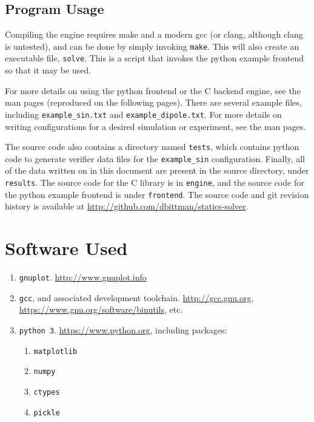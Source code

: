\documentclass[12pt]{article}
\begin{document}
\clearpage
\begin{appendices}
\section{Program Usage}

Compiling the engine requires make and a modern gcc (or clang, although clang is untested), and can
be done by simply invoking \texttt{make}. This will also create an executable file, \texttt{solve}. This
is a script that invokes the python example frontend so that it may be used.

For more details on using the python frontend or the C backend engine, see the man pages (reproduced on the
following pages). There are several example files, including \texttt{example\_sin.txt} and \texttt{example\_dipole.txt}.
For more details on writing configurations for a desired simulation or experiment, see the man pages.

The source code also contains a directory named \texttt{tests}, which contains python code to generate verifier data
files for the \texttt{example\_sin} configuration. Finally, all of the data written on in this document are present
in the source directory, under \texttt{results}. The source code for the C library is in \texttt{engine}, and the
source code for the python example frontend is under \texttt{frontend}. The source code and git revision history
is available at \url{http://github.com/dbittman/statics-solver}.

	\begin{singlespacing}


\restoregeometry
	\end{singlespacing}
\clearpage






\end{appendices}

\clearpage

\section*{Software Used}

\begin{enumerate}
	\item \texttt{gnuplot}. \url{http://www.gnuplot.info}
	\item \texttt{gcc}, and associated development toolchain. \url{http://gcc.gnu.org}, \url{https://www.gnu.org/software/binutils}, etc.
	\item \texttt{python 3}. \url{https://www.python.org}, including packages:
		\begin{enumerate}
			\item \texttt{matplotlib}
			\item \texttt{numpy}
			\item \texttt{ctypes}
			\item \texttt{pickle}
		\end{enumerate}
\end{enumerate}

\clearpage

\onehalfspacing

\end{document}
